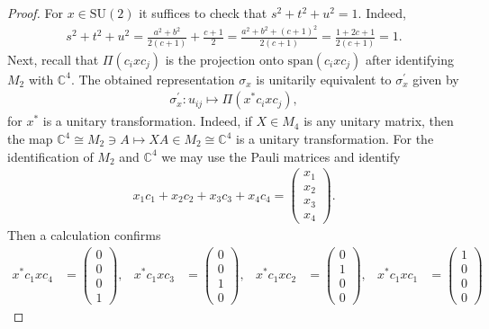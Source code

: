 \documentclass[a4paper]{amsart}
\newcommand{\C}{\mathbb{C}}
\begin{document}
\begin{proof}
    For $x \in \mathrm{SU}(2)$ it suffices to check that $s^2+t^2+u^2 = 1$. Indeed,
    \begin{align*}
        s^2+t^2+u^2 = \frac{a^2+b^2}{2(c+1)} + \frac{c+1}{2}
            = \frac{a^2 + b^2 + (c+1)^2}{2(c+1)}
            = \frac{1 + 2c + 1}{2(c+1)} = 1.
    \end{align*}
    Next, recall that $\Pi(c_i x c_j)$ is the projection onto $\mathrm{span}(c_i x c_j)$ after identifying $M_2$ with $\C^4$. The obtained representation $\sigma_x$ is unitarily equivalent to $\sigma_x^\prime$ given by 
    \begin{align*}
        \sigma_x^\prime: u_{ij} \mapsto \Pi(x^\ast c_i x c_j),
    \end{align*}
    for $x^\ast$ is a unitary transformation. 
    Indeed, if $X \in M_4$ is any unitary matrix, then the map $\C^4 \cong M_2 \ni A \mapsto XA \in M_2 \cong \C^4$ is a unitary transformation.
    For the identification of $M_2$ and $\C^4$ we may use the Pauli matrices and identify
    \begin{align*}
        x_1 c_1 + x_2 c_2 + x_3 c_3 + x_4 c_4 = \begin{pmatrix}
            x_1 \\ x_2 \\ x_3 \\ x_4
        \end{pmatrix}.
    \end{align*}
    Then a calculation confirms
    \begin{align*}
        x^\ast c_1 x c_4 &= \begin{pmatrix}
            0 \\ 0 \\ 0 \\ 1
        \end{pmatrix},&
        x^\ast c_1 x c_3 &= \begin{pmatrix}
            0 \\ 0 \\ 1 \\ 0
        \end{pmatrix},&
        x^\ast c_1 x c_2 &= \begin{pmatrix}
            0 \\ 1 \\ 0 \\ 0
        \end{pmatrix}, &
        x^\ast c_1 x c_1 &= \begin{pmatrix}
            1 \\ 0 \\ 0 \\ 0

\end{pmatrix}
\end{align*}
\end{proof}
\end{document}

